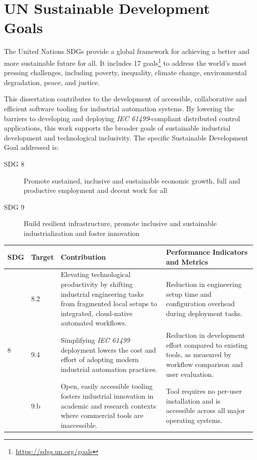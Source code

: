 
\chapter*{UN Sustainable Development Goals} \label{chap:UnitedNations}

The United Nations \acp{SDG} provide a global framework for achieving a better and more sustainable future for all.
It includes 17 goals\footnote{\url{https://sdgs.un.org/goals}} to address the world's most pressing challenges, including poverty, inequality, climate change, environmental degradation, peace, and justice.

This dissertation contributes to the development of accessible, collaborative and efficient software tooling for industrial automation systems. By lowering the barriers to developing and deploying \textit{IEC 61499}-compliant distributed control applications, this work supports the broader goals of sustainable industrial development and technological inclusivity. The specific Sustainable Development Goal addressed is:

\begin{description}
\item [SDG 8]
Promote sustained, inclusive and sustainable economic growth, full and productive employment and decent work for all
\item [SDG 9]
Build resilient infrastructure, promote inclusive and sustainable industrialization and foster innovation
\end{description}

\begin{center}
\begin{tabular}{|l|l|p{58mm}|p{52mm}|}
\hline
\textbf{SDG} & \textbf{Target} & \textbf{Contribution} & \textbf{Performance Indicators and Metrics} \\
\hline
\hline
    \multirow{4}{*}{8} & 8.2 & Elevating technological productivity by shifting industrial engineering tasks from fragmented local setups to integrated, cloud-native automated workflows. & Reduction in engineering setup time and configuration overhead during deployment tasks. \\
\hline
    \multirow{4}{*}{9} & 9.4 & Simplifying \textit{IEC 61499} deployment lowers the cost and effort of adopting modern industrial automation practices. & Reduction in development effort compared to existing tools, as measured by workflow comparison and user evaluation. \\
    \cline{2-4} & 9.b & Open, easily accessible tooling fosters industrial innovation in academic and research contexts where commercial tools are inaccessible. & Tool requires no per-user installation and is accessible across all major operating systems. \\
\hline
\end{tabular}
\end{center}
